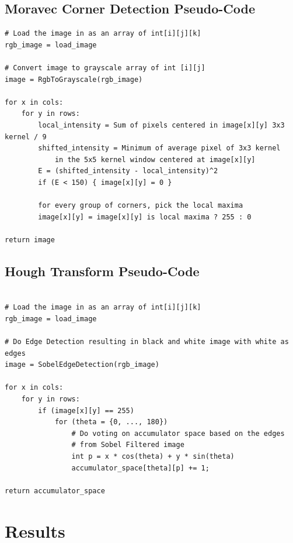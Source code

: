 \documentclass{article}
\begin{document}
        \subsection{Moravec Corner Detection Pseudo-Code}
        \begin{lstlisting}[basicstyle=\footnotesize]
# Load the image in as an array of int[i][j][k]
rgb_image = load_image

# Convert image to grayscale array of int [i][j]
image = RgbToGrayscale(rgb_image)

for x in cols:
    for y in rows: 
        local_intensity = Sum of pixels centered in image[x][y] 3x3 kernel / 9
        shifted_intensity = Minimum of average pixel of 3x3 kernel 
            in the 5x5 kernel window centered at image[x][y]
        E = (shifted_intensity - local_intensity)^2
        if (E < 150) { image[x][y] = 0 }
        
        for every group of corners, pick the local maxima
        image[x][y] = image[x][y] is local maxima ? 255 : 0
        
return image

        \end{lstlisting}
        \subsection{Hough Transform Pseudo-Code}
        \begin{lstlisting}[basicstyle=\footnotesize]
        
# Load the image in as an array of int[i][j][k]
rgb_image = load_image

# Do Edge Detection resulting in black and white image with white as edges
image = SobelEdgeDetection(rgb_image)

for x in cols:
    for y in rows: 
        if (image[x][y] == 255) 
            for (theta = {0, ..., 180}) 
                # Do voting on accumulator space based on the edges 
                # from Sobel Filtered image
                int p = x * cos(theta) + y * sin(theta)
                accumulator_space[theta][p] += 1;

return accumulator_space
        \end{lstlisting}


\section{Results}
\end{document}
